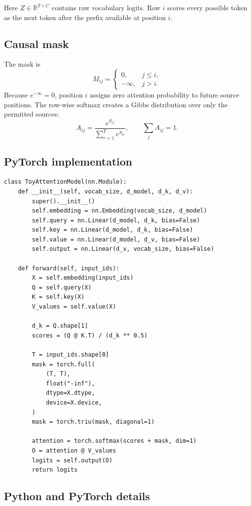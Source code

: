 \documentclass[11pt]{article}
\newcommand{\R}{\mathbb{R}}
\begin{document}
Here $Z\in\R^{T\times C}$ contains raw vocabulary logits. Row $i$ scores every possible token as the next
token after the prefix available at position $i$.

\subsection{Causal mask}

The mask is
\[
M_{ij}=\begin{cases}
0,&j\le i,\\
-\infty,&j>i.
\end{cases}
\]
Because $e^{-\infty}=0$, position $i$ assigns zero attention probability to future source positions. The
row-wise softmax creates a Gibbs distribution over only the permitted sources:
\[
A_{ij}=\frac{e^{S_{ij}}}{\sum_{r=1}^{T}e^{S_{ir}}},
\qquad \sum_j A_{ij}=1.
\]

\subsection{PyTorch implementation}

\begin{lstlisting}
class ToyAttentionModel(nn.Module):
    def __init__(self, vocab_size, d_model, d_k, d_v):
        super().__init__()
        self.embedding = nn.Embedding(vocab_size, d_model)
        self.query = nn.Linear(d_model, d_k, bias=False)
        self.key = nn.Linear(d_model, d_k, bias=False)
        self.value = nn.Linear(d_model, d_v, bias=False)
        self.output = nn.Linear(d_v, vocab_size, bias=False)

    def forward(self, input_ids):
        X = self.embedding(input_ids)
        Q = self.query(X)
        K = self.key(X)
        V_values = self.value(X)

        d_k = Q.shape[1]
        scores = (Q @ K.T) / (d_k ** 0.5)

        T = input_ids.shape[0]
        mask = torch.full(
            (T, T),
            float("-inf"),
            dtype=X.dtype,
            device=X.device,
        )
        mask = torch.triu(mask, diagonal=1)

        attention = torch.softmax(scores + mask, dim=1)
        O = attention @ V_values
        logits = self.output(O)
        return logits
\end{lstlisting}

\subsection{Python and PyTorch details}
\end{document}
